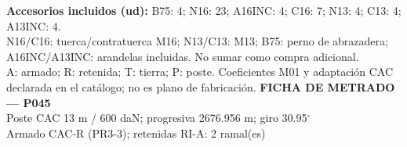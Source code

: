 \begingroup\scriptsize
\textbf{Accesorios incluidos (ud):} B75: 4; N16: 23; A16INC: 4; C16: 7; N13: 4; C13: 4; A13INC: 4.\\
N16/C16: tuerca/contratuerca M16; N13/C13: M13; B75: perno de abrazadera; A16INC/A13INC: arandelas incluidas. No sumar como compra adicional.\\
A: armado; R: retenida; T: tierra; P: poste. Coeficientes M01 y adaptación CAC declarada en el catálogo; no es plano de fabricación.
\endgroup\endgroup
\clearpage{}
\begingroup\small\setlength{\parskip}{3pt}\renewcommand{\arraystretch}{1.05}
\textbf{\large FICHA DE METRADO — P045}\\[4pt]
Poste CAC 13 m / 600 daN; progresiva 2676.956 m; giro 30.95\ensuremath{^\circ}\\
Armado CAC-R (PR3-3); retenidas RI-A: 2 ramal(es)\\
\begingroup\scriptsize
